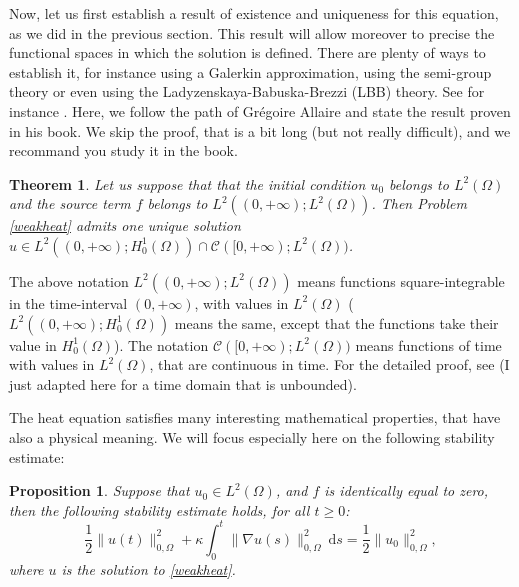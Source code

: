 \documentclass{article}
\newtheorem{theorem}{Theorem}
\newtheorem{proposition}{Proposition}
\begin{document}

Now, let us first establish a result of existence and uniqueness for this equation, as we did in the previous section.
This result will allow moreover to precise the functional spaces in which the solution is defined.
There are plenty of ways to establish it, for instance using a Galerkin approximation, using the semi-group theory or even using the Ladyzenskaya-Babuska-Brezzi (LBB) theory. See for instance \cite{allaire07,ern04,raviart83}. %
Here, we follow the path of Grégoire Allaire and state the result proven in his book. We skip the proof, that is a bit long (but not really difficult), and we recommand you study it in the book. 

\begin{theorem}
\label{heatexistence} 
Let us suppose that that the initial condition $u_0$ belongs to $L^2(\Omega)$ and the source term $f$ belongs to $L^2((0,+\infty);L^2(\Omega))$. Then Problem \eqref{weakheat} admits one unique solution $u \in L^2((0,+\infty);H^1_0(\Omega)) \cap \mathcal{C}([0,+\infty);L^2(\Omega))$.
\end{theorem}

The above notation $L^2((0,+\infty);L^2(\Omega))$ means functions square-integrable in the time-interval $(0,+\infty)$, with values in $L^2(\Omega)$ ($L^2((0,+\infty);H^1_0(\Omega))$ means the same, except that the functions take their value in $H^1_0(\Omega)$). The notation $\mathcal{C}([0,+\infty);L^2(\Omega))$ means functions of time with values in $L^2(\Omega)$, that are continuous in time. For the detailed proof, see \cite[Theorem 8.2.3]{allaire07} %
(I just adapted here for a time domain that is unbounded).

\medskip

The heat equation satisfies many interesting mathematical properties, that have also a physical meaning. We will focus especially here on the following stability estimate:

\begin{proposition}
Suppose that $u_0 \in L^2(\Omega)$, and $f$ is identically equal to zero, then the following stability estimate holds, for all $t\geq0$:
\begin{equation}
    \label{stabHeat}
    \frac12 
    \| u(t) \|^2_{0,\Omega}
    + \kappa
    \int_0^t \| \nabla u(s) \|^2_{0,\Omega} \ \mathrm{d}s
    =
    \frac12 
    \| u_0 \|^2_{0,\Omega},
\end{equation}
where $u$ is the solution to \eqref{weakheat}.
\end{proposition}
\end{document}
